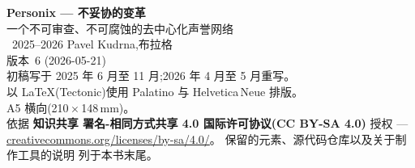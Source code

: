 \thispagestyle{empty}
\ifdefined\printmode\vspace*{\fill}\else{}\fi
\begin{flushleft}\small\sffamily
\textbf{Personix --- 不妥协的变革}\\[0.3em]
一个不可审查、不可腐蚀的去中心化声誉网络\\[1.4em]

\textcopyright\ 2025--2026 Pavel Kudrna,布拉格\\[0.4em]

版本~6 (2026-05-21)\\
初稿写于 2025 年 6 月至 11 月;2026 年 4 月至 5 月重写。\\[1.4em]

以 \LaTeX{}(Tectonic)使用 Palatino 与 Helvetica\,Neue 排版。\\
A5 横向(210\,$\times$\,148\,mm)。\\[1.4em]

依据 \textbf{知识共享 署名-相同方式共享 4.0
国际许可协议(CC BY-SA 4.0)} 授权 ---
\href{https://creativecommons.org/licenses/by-sa/4.0/}{creativecommons.org/licenses/by-sa/4.0/}。
保留的元素、源代码仓库以及关于制作工具的说明
列于本书末尾。
\end{flushleft}
\ifdefined\printmode\else{}\fi
\clearpage
